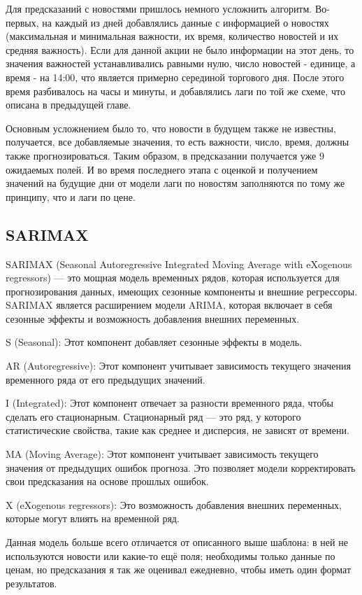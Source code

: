 \documentclass[12pt, a4paper]{article}
\begin{document}
Для предсказаний с новостями пришлось немного усложнить алгоритм. Во-первых, на каждый из дней добавлялись данные с информацией о новостях (максимальная и минимальная важности, их время, количество новостей и их средняя важность). Если для данной акции не было информации на этот день, то значения важностей устанавливались равными нулю, число новостей - единице, а время - на 14:00, что является примерно серединой торгового дня. После этого время разбивалось на часы и минуты, и добавлялись лаги по той же схеме, что описана в предыдущей главе.

Основным усложнением было то, что новости в будущем также не известны, получается, все добавляемые значения, то есть важности, число, время, должны также прогнозироваться. Таким образом, в предсказании получается уже 9 ожидаемых полей. И во время последнего этапа с оценкой и получением значений на будущие дни от модели лаги по новостям заполняются по тому же принципу, что и лаги по цене.

\subsection{SARIMAX}

SARIMAX (Seasonal Autoregressive Integrated Moving Average with eXogenous regressors) — это мощная модель временных рядов, которая используется для прогнозирования данных, имеющих сезонные компоненты и внешние регрессоры. SARIMAX является расширением модели ARIMA, которая включает в себя сезонные эффекты и возможность добавления внешних переменных.

S (Seasonal): Этот компонент добавляет сезонные эффекты в модель.

AR (Autoregressive): Этот компонент учитывает зависимость текущего значения временного ряда от его предыдущих значений. 

I (Integrated): Этот компонент отвечает за разности временного ряда, чтобы сделать его стационарным. Стационарный ряд — это ряд, у которого статистические свойства, такие как среднее и дисперсия, не зависят от времени.

MA (Moving Average): Этот компонент учитывает зависимость текущего значения от предыдущих ошибок прогноза. Это позволяет модели корректировать свои предсказания на основе прошлых ошибок.

X (eXogenous regressors): Это возможность добавления внешних переменных, которые могут влиять на временной ряд.

Данная модель больше всего отличается от описанного выше шаблона: в ней не используются новости или какие-то ещё поля; необходимы только данные по ценам, но предсказания я так же оценивал ежедневно, чтобы иметь один формат результатов.
\end{document}
